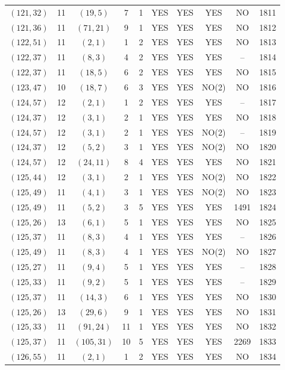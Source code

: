 \begin{longtable}{|c|c|c|c|c|c|c|c|c|c|}
$(121, 32)$ & 11 & $(19, 5)$ & 7 & 1 & YES & YES & YES & NO & 1811\\
$(121, 36)$ & 11 & $(71, 21)$ & 9 & 1 & YES & YES & YES & NO & 1812\\
$(122, 51)$ & 11 & $(2, 1)$ & 1 & 2 & YES & YES & YES & NO & 1813\\
$(122, 37)$ & 11 & $(8, 3)$ & 4 & 2 & YES & YES & YES & -- & 1814\\
$(122, 37)$ & 11 & $(18, 5)$ & 6 & 2 & YES & YES & YES & NO & 1815\\
$(123, 47)$ & 10 & $(18, 7)$ & 6 & 3 & YES & YES & NO(2) & NO & 1816\\
$(124, 57)$ & 12 & $(2, 1)$ & 1 & 2 & YES & YES & YES & -- & 1817\\
$(124, 37)$ & 12 & $(3, 1)$ & 2 & 1 & YES & YES & YES & NO & 1818\\
$(124, 57)$ & 12 & $(3, 1)$ & 2 & 1 & YES & YES & NO(2) & -- & 1819\\
$(124, 37)$ & 12 & $(5, 2)$ & 3 & 1 & YES & YES & NO(2) & NO & 1820\\
$(124, 57)$ & 12 & $(24, 11)$ & 8 & 4 & YES & YES & YES & NO & 1821\\
$(125, 44)$ & 12 & $(3, 1)$ & 2 & 1 & YES & YES & NO(2) & NO & 1822\\
$(125, 49)$ & 11 & $(4, 1)$ & 3 & 1 & YES & YES & NO(2) & NO & 1823\\
$(125, 49)$ & 11 & $(5, 2)$ & 3 & 5 & YES & YES & YES & 1491 & 1824\\
$(125, 26)$ & 13 & $(6, 1)$ & 5 & 1 & YES & YES & YES & NO & 1825\\
$(125, 37)$ & 11 & $(8, 3)$ & 4 & 1 & YES & YES & YES & -- & 1826\\
$(125, 49)$ & 11 & $(8, 3)$ & 4 & 1 & YES & YES & NO(2) & NO & 1827\\
$(125, 27)$ & 11 & $(9, 4)$ & 5 & 1 & YES & YES & YES & -- & 1828\\
$(125, 33)$ & 11 & $(9, 2)$ & 5 & 1 & YES & YES & YES & -- & 1829\\
$(125, 37)$ & 11 & $(14, 3)$ & 6 & 1 & YES & YES & YES & NO & 1830\\
$(125, 26)$ & 13 & $(29, 6)$ & 9 & 1 & YES & YES & YES & NO & 1831\\
$(125, 33)$ & 11 & $(91, 24)$ & 11 & 1 & YES & YES & YES & NO & 1832\\
$(125, 37)$ & 11 & $(105, 31)$ & 10 & 5 & YES & YES & YES & 2269 & 1833\\
$(126, 55)$ & 11 & $(2, 1)$ & 1 & 2 & YES & YES & YES & NO & 1834\\

\end{longtable}
